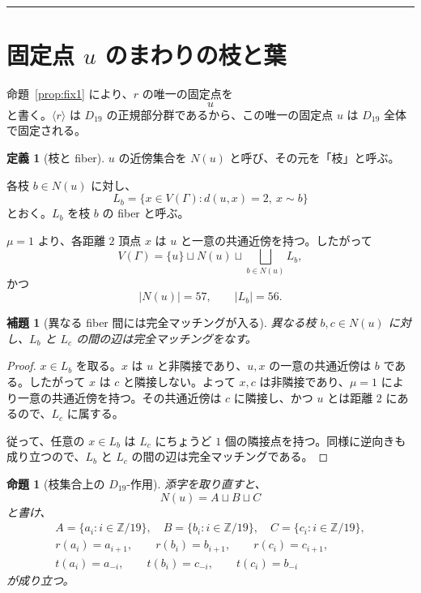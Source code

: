 \documentclass[11pt,a4paper]{article}
\theoremstyle{plain}
\newtheorem{proposition}[theorem]{命題}
\newtheorem{lemma}[theorem]{補題}
\theoremstyle{definition}
\newtheorem{definition}[theorem]{定義}
\theoremstyle{remark}
\begin{document}
\bigskip
\hrule
\bigskip

\section{固定点 $u$ のまわりの枝と葉}

命題~\ref{prop:fix1} により、$r$ の唯一の固定点を
\[
u
\]
と書く。$\langle r \rangle$ は $D_{19}$ の正規部分群であるから、この唯一の固定点 $u$ は $D_{19}$ 全体で固定される。

\begin{definition}[枝と fiber]
$u$ の近傍集合を $N(u)$ と呼び、その元を「枝」と呼ぶ。

各枝 $b \in N(u)$ に対し、
\[
L_b = \{x \in V(\Gamma) : d(u,x) = 2,\ x \sim b\}
\]
とおく。$L_b$ を枝 $b$ の fiber と呼ぶ。

$\mu = 1$ より、各距離 $2$ 頂点 $x$ は $u$ と一意の共通近傍を持つ。したがって
\[
V(\Gamma) = \{u\} \sqcup N(u) \sqcup \bigsqcup_{b \in N(u)} L_b,
\]
かつ
\[
|N(u)| = 57, \qquad |L_b| = 56.
\]
\end{definition}

\begin{lemma}[異なる fiber 間には完全マッチングが入る]\label{lem:matching}
異なる枝 $b,c \in N(u)$ に対し、$L_b$ と $L_c$ の間の辺は完全マッチングをなす。
\end{lemma}

\begin{proof}
$x \in L_b$ を取る。$x$ は $u$ と非隣接であり、$u,x$ の一意の共通近傍は $b$ である。したがって $x$ は $c$ と隣接しない。よって $x,c$ は非隣接であり、$\mu = 1$ により一意の共通近傍を持つ。その共通近傍は $c$ に隣接し、かつ $u$ とは距離 $2$ にあるので、$L_c$ に属する。

従って、任意の $x \in L_b$ は $L_c$ にちょうど $1$ 個の隣接点を持つ。同様に逆向きも成り立つので、$L_b$ と $L_c$ の間の辺は完全マッチングである。
\end{proof}

\begin{proposition}[枝集合上の $D_{19}$-作用]\label{prop:D19branches}
添字を取り直すと、
\[
N(u) = A \sqcup B \sqcup C
\]
と書け、
\begin{gather*}
A = \{a_i : i \in \mathbb{Z}/19\}, \quad
B = \{b_i : i \in \mathbb{Z}/19\}, \quad
C = \{c_i : i \in \mathbb{Z}/19\}, \\
r(a_i) = a_{i+1}, \qquad r(b_i) = b_{i+1}, \qquad r(c_i) = c_{i+1}, \\
t(a_i) = a_{-i}, \qquad t(b_i) = c_{-i}, \qquad t(c_i) = b_{-i}
\end{gather*}
が成り立つ。
\end{proposition}
\end{document}
